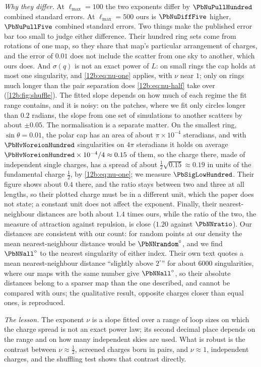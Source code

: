 \emph{Why they differ.} At $\ell_{\max}=100$ the two exponents differ by $\PbNuPullHundred$ combined standard errors. At
$\ell_{\max}=500$ ours is $\PbNuDiffFive$ higher, $\PbNuPullFive$ combined standard errors. Two things make the published error bar too small to judge either difference. Their hundred ring sets come from rotations
of one map, so they share that map's particular arrangement of charges, and the error of $0.01$ does not include the
scatter from one sky to another, which ours does. And $\sigma(q)$ is not an exact power of $L$: on small rings the cap
holds at most one singularity, and \eqref{12b:eq:nu-one} applies, with $\nu$ near $1$; only on rings much longer than the
pair separation does \eqref{12b:eq:nu-half} take over (\cref{12b:fig:shuffle}). The fitted slope depends on how much of
each regime the fit range contains, and it is noisy: on the patches, where we fit only circles longer than $0.2$
radians, the slope from one set of simulations to another scatters by about $\pm0.05$. The
normalisation is a separate matter. On the smallest ring, $\sin\theta=0.01$, the polar cap has an area of about
$\pi\times10^{-4}$ steradians, and with $\PbHvNoreionHundred$ singularities on $4\pi$ steradians it holds on average
$\PbHvNoreionHundred\times10^{-4}/4\approx0.15$ of them, so the charge there, made of independent single charges, has a spread of about
$\frac12\sqrt{0.15}\approx0.19$ in units of the fundamental charge $\frac12$, by \eqref{12b:eq:nu-one}; we measure
$\PbSigLowHundred$. Their figure shows about $0.4$ there, and the ratio stays between two and three at all lengths, so
their plotted charge must be in a different unit, which the paper does not state; a constant unit does not affect the
exponent. Finally, their nearest-neighbour distances are both about $1.4$ times ours, while the ratio of the two,
the measure of attraction against repulsion, is close ($1.20$ against $\PbNNratio$). Our distances are consistent with our
count: for random points at our density the mean nearest-neighbour distance would be $\PbNNrandom^\circ$, and we find
$\PbNNall^\circ$ to the nearest singularity of either index. Their own text quotes a mean nearest-neighbour distance
``slightly above $2^\circ$'' for about $6000$ singularities, where our maps with the same number give
$\PbNNall^\circ$, so their absolute distances belong to a sparser map than the one described, and cannot be compared
with ours; the qualitative result, opposite charges closer than equal ones, is reproduced.

\emph{The lesson.} The exponent $\nu$ is a slope fitted over a range of loop sizes on which the charge spread is not an
exact power law; its second decimal place depends on the range and on how many independent skies are used. What is
robust is the contrast between $\nu\approx\frac12$, screened charges born in pairs, and $\nu\approx1$, independent charges,
and the shuffling test shows that contrast directly.

